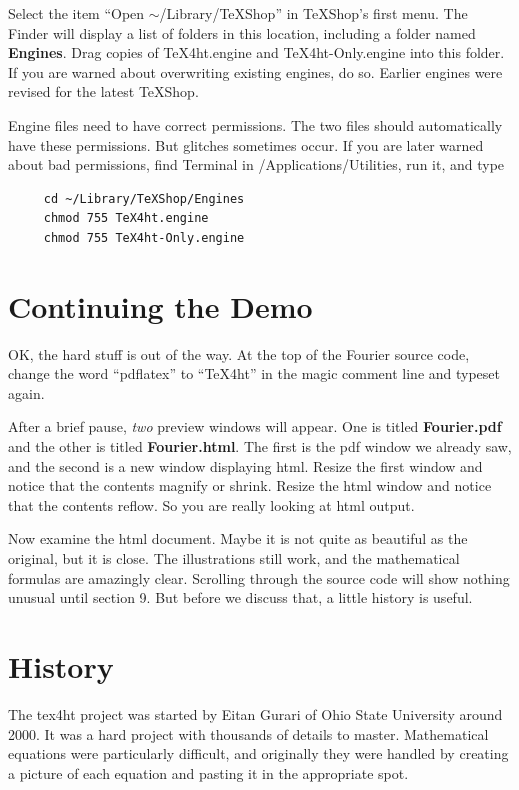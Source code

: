 \documentclass[11pt, oneside]{article}   	%
\begin{document}
\newpage
Select the item 
``Open $\sim$/Library/TeXShop'' in TeXShop's first menu.  The Finder will display a  list of folders in this location, including a folder named {\bf Engines}. 
Drag copies of  TeX4ht.engine and TeX4ht-Only.engine into this folder.
If you are warned about overwriting existing engines, do so. Earlier engines were revised for the latest TeXShop.

Engine files need to have correct permissions. The two files should automatically have these permissions.
But glitches sometimes occur. If you are later warned about bad permissions, find Terminal in /Applications/Utilities, run it,  and type
\begin{verbatim}
     cd ~/Library/TeXShop/Engines
     chmod 755 TeX4ht.engine
     chmod 755 TeX4ht-Only.engine
\end{verbatim}

\section{Continuing the Demo}
OK, the hard stuff is out of the way. At the top of the Fourier source code, change the word ``pdflatex''
to ``TeX4ht'' in the magic comment line and typeset again.

After a brief pause, {\em two} preview windows will appear. One is titled {\bf Fourier.pdf}
and the other is titled {\bf Fourier.html}. The first is the pdf window we already saw, and
the second is a new window displaying html. Resize the first window and notice that the
contents magnify or shrink. Resize the html window and notice that the contents reflow. So you are really looking at html output.

Now examine the html document. Maybe it is not quite as beautiful as the original, but it is close.
The illustrations still work, and the mathematical formulas are amazingly clear. Scrolling through
the source code will show nothing unusual until section 9. But before we discuss that, a little history
is useful.

\section{History}

The tex4ht project was started by Eitan Gurari of Ohio State University
around 2000. It was a hard project with thousands of details to master. Mathematical equations
were particularly difficult, and originally they were handled by creating a  picture of each
equation and pasting it in the appropriate spot.
\end{document}
